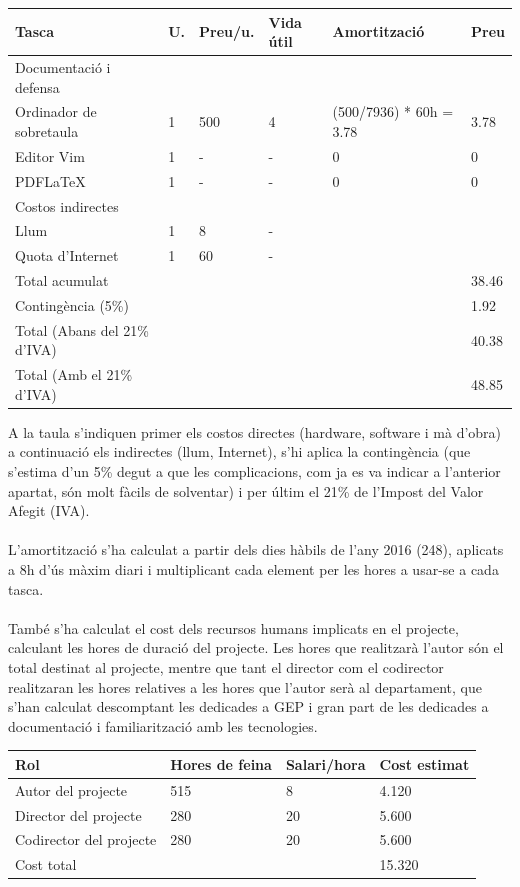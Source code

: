 \documentclass[11pt]{article}
\begin{document}
\begin{center}
\begin{tabular}{| l | l | l | l | l | l |}
		Tasca & U. & Preu/u. & Vida útil & Amortització & Preu \\ \hline
		Documentació i defensa & & & & & \\ \hline
		Ordinador de sobretaula & 1 & 500 & 4 & (500/7936) * 60h = 3.78 & 3.78 \\ \hline
		Editor Vim & 1 & - & - & 0 & 0 \\ \hline
		PDFLaTeX & 1 & - & - & 0 & 0 \\ \hline
		Costos indirectes & & & & & \\ \hline
		Llum & 1 & 8 & - & & \\ \hline
		Quota d'Internet & 1 & 60 & - & & \\ \hline
		Total acumulat & & & & & 38.46 \\ \hline
		Contingència (5\%) & & & & & 1.92 \\ \hline
		Total (Abans del 21\% d'IVA) & & & & & 40.38 \\ \hline
		Total (Amb el 21\% d'IVA) & & & & & 48.85 \\ \hline
		\hline
	\end{tabular}
\end{center}
A la taula s’indiquen primer els costos directes (hardware, software i mà d’obra) a continuació els indirectes (llum, Internet), s’hi aplica la contingència (que s’estima d’un 5\% degut a que les complicacions, com ja es va indicar a l’anterior apartat, són molt fàcils de solventar) i per últim el 21\% de l’Impost del Valor Afegit (IVA). \\
\\
L’amortització s’ha calculat a partir dels dies hàbils de l’any 2016 (248), aplicats a 8h d’ús màxim diari i multiplicant cada element per les hores a usar-se a cada tasca.\\
\\
També s’ha calculat el cost dels recursos humans implicats en el projecte, calculant les hores de duració del projecte. Les hores que realitzarà l’autor són el total destinat al projecte, mentre que tant el director com el codirector realitzaran les hores relatives a les hores que l’autor serà al departament, que s’han calculat descomptant les dedicades a GEP i gran part de les dedicades a documentació i familiarització amb les tecnologies.
\begin{center}
	\begin{tabular}{| l | l | l | l |}
		\hline
		Rol & Hores de feina & Salari/hora & Cost estimat \\ \hline
		Autor del projecte & 515 & 8 & 4.120 \\ \hline
		Director del projecte & 280 & 20 & 5.600 \\ \hline
		Codirector del projecte & 280 & 20 & 5.600 \\ \hline
		Cost total & & & 15.320 \\ \hline
		\hline
	\end{tabular}
\end{center}
\end{document}
